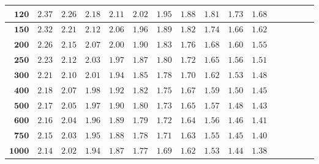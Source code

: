 \begin{alternateColorTable}
\begin{longtable}{|r|r|r|r|r|r|r|r|r|r|r|r|r|r|r|r|}
    \(\mathbf{120}\) & \(2.37\)  & \(2.26\)  & \(2.18\)  & \(2.11\)  & \(2.02\)  & \(1.95\)  & \(1.88\)  & \(1.81\)  & \(1.73\)  & \(1.68\) \\ \hline 
    \(\mathbf{150}\) & \(2.32\)  & \(2.21\)  & \(2.12\)  & \(2.06\)  & \(1.96\)  & \(1.89\)  & \(1.82\)  & \(1.74\)  & \(1.66\)  & \(1.62\) \\ \hline 
    \(\mathbf{200}\) & \(2.26\)  & \(2.15\)  & \(2.07\)  & \(2.00\)  & \(1.90\)  & \(1.83\)  & \(1.76\)  & \(1.68\)  & \(1.60\)  & \(1.55\) \\ \hline 
    \(\mathbf{250}\) & \(2.23\)  & \(2.12\)  & \(2.03\)  & \(1.97\)  & \(1.87\)  & \(1.80\)  & \(1.72\)  & \(1.65\)  & \(1.56\)  & \(1.51\) \\ \hline 
    \(\mathbf{300}\) & \(2.21\)  & \(2.10\)  & \(2.01\)  & \(1.94\)  & \(1.85\)  & \(1.78\)  & \(1.70\)  & \(1.62\)  & \(1.53\)  & \(1.48\) \\ \hline 
    \(\mathbf{400}\) & \(2.18\)  & \(2.07\)  & \(1.98\)  & \(1.92\)  & \(1.82\)  & \(1.75\)  & \(1.67\)  & \(1.59\)  & \(1.50\)  & \(1.45\) \\ \hline 
    \(\mathbf{500}\) & \(2.17\)  & \(2.05\)  & \(1.97\)  & \(1.90\)  & \(1.80\)  & \(1.73\)  & \(1.65\)  & \(1.57\)  & \(1.48\)  & \(1.43\) \\ \hline 
    \(\mathbf{600}\) & \(2.16\)  & \(2.04\)  & \(1.96\)  & \(1.89\)  & \(1.79\)  & \(1.72\)  & \(1.64\)  & \(1.56\)  & \(1.46\)  & \(1.41\) \\ \hline 
    \(\mathbf{750}\) & \(2.15\)  & \(2.03\)  & \(1.95\)  & \(1.88\)  & \(1.78\)  & \(1.71\)  & \(1.63\)  & \(1.55\)  & \(1.45\)  & \(1.40\) \\ \hline 
    \(\mathbf{1000}\) & \(2.14\)  & \(2.02\)  & \(1.94\)  & \(1.87\)  & \(1.77\)  & \(1.69\)  & \(1.62\)  & \(1.53\)  & \(1.44\)  & \(1.38\) \\ \hline 
\end{longtable}
\end{alternateColorTable}
\changefontsizes{11pt}

\renewcommand{\arraystretch}{1}











